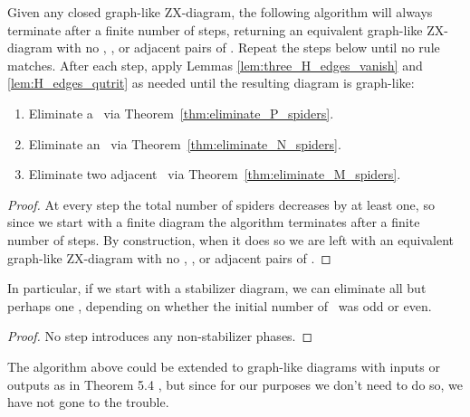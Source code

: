 \begin{theorem}\label{thm:simplification_algorithm_works}
	Given any closed graph-like ZX-diagram, the following algorithm will always terminate after a finite number of steps, returning an equivalent graph-like ZX-diagram with no \Nspiders, \Pspiders, or adjacent pairs of \Mspiders. Repeat the steps below until no rule matches. After each step, apply Lemmas \ref{lem:three_H_edges_vanish} and \ref{lem:H_edges_qutrit} as needed until the resulting diagram is graph-like:
	\begin{enumerate}
		\item Eliminate a \Pspider\ via Theorem~\ref{thm:eliminate_P_spiders}.
		\item Eliminate an \Nspider\ via Theorem~\ref{thm:eliminate_N_spiders}.
		\item Eliminate two adjacent \Mspiders\ via Theorem~\ref{thm:eliminate_M_spiders}.
	\end{enumerate}
	\begin{proof}
		At every step the total number of spiders decreases by at least one, so since we start with a finite diagram the algorithm terminates after a finite number of steps. By construction, when it does so we are left with an equivalent graph-like ZX-diagram with no \Nspiders, \Pspiders, or adjacent pairs of \Mspiders.
	\end{proof}
\end{theorem}

\begin{corollary}\label{cor:stabilizer_simplification_algorithm_works}
	In particular, if we start with a stabilizer diagram, we can eliminate all but perhaps one \Mspider, depending on whether the initial number of \Mspiders\ was odd or even. 
	\begin{proof}
		No step introduces any non-stabilizer phases.
	\end{proof}
\end{corollary}

The algorithm above could be extended to graph-like diagrams with inputs or outputs as in Theorem 5.4 \cite{graph_theoretic_simplification}, but since for our purposes we don't need to do so, we have not gone to the trouble.
